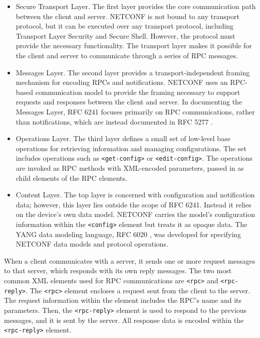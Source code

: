 \begin{itemize}
    \item Secure Transport Layer. The first layer provides the core communication path between the client and server. NETCONF is not bound to any transport protocol, but it can be executed over any transport protocol, including Transport Layer Security and Secure Shell. However, the protocol must provide the necessary functionality. The transport layer makes it possible for the client and server to communicate through a series of RPC messages.
    
    \item Messages Layer. The second layer provides a transport-independent framing mechanism for encoding RPCs and notifications. NETCONF uses an RPC-based communication model to provide the framing necessary to support requests and responses between the client and server. In documenting the Messages Layer, RFC 6241 \cite{rfc6241} focuses primarily on RPC communications, rather than notifications, which are instead documented in RFC 5277 \cite{rfc5277}.
    
    \item Operations Layer. The third layer defines a small set of low-level base operations for retrieving information and managing configurations. The set includes operations such as \texttt{<get-config>} or \texttt{<edit-config>}. The operations are invoked as RPC methods with XML-encoded parameters, passed in as child elements of the RPC elements.
    
    \item Content Layer. The top layer is concerned with configuration and notification data; however, this layer lies outside the scope of RFC 6241. Instead it relies on the device's own data model. NETCONF carries the model's configuration information within the \texttt{<config>} element but treats it as opaque data. The YANG data modeling language, RFC 6020 \cite{6020}, was developed for specifying NETCONF data models and protocol operations.
\end{itemize}

When a client communicates with a server, it sends one or more request messages to that server, which responds with its own reply messages. The two most common XML elements used for RPC communications are \texttt{<rpc>} and \texttt{<rpc-reply>}. The \texttt{<rpc>} element encloses a request sent from the client to the server. The request information within the element includes the RPC's name and its parameters. Then, the \texttt{<rpc-reply>} element is used to respond to the previous messages, and it is sent by the server. All response data is encoded within the \texttt{<rpc-reply>} element.

